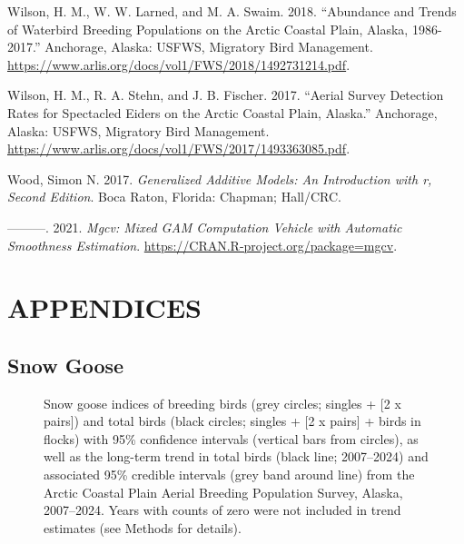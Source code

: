 \documentclass[
]{article}
\newlength{\cslhangindent}
\newenvironment{CSLReferences}[2] %
 {\begin{list}{}{%
  \setlength{\itemindent}{0pt}
  \setlength{\leftmargin}{0pt}
  \setlength{\parsep}{0pt}
  \ifodd #1
   \setlength{\leftmargin}{\cslhangindent}
   \setlength{\itemindent}{-1\cslhangindent}
  \fi
  \setlength{\itemsep}{#2\baselineskip}}}
 {\end{list}}
\begin{document}
\begin{CSLReferences}{1}{0}
Wilson, H. M., W. W. Larned, and M. A. Swaim. 2018. {``Abundance and
Trends of Waterbird Breeding Populations on the Arctic Coastal Plain,
Alaska, 1986-2017.''} Anchorage, Alaska: USFWS, Migratory Bird
Management.
\url{https://www.arlis.org/docs/vol1/FWS/2018/1492731214.pdf}.

Wilson, H. M., R. A. Stehn, and J. B. Fischer. 2017. {``Aerial Survey
Detection Rates for Spectacled Eiders on the Arctic Coastal Plain,
Alaska.''} Anchorage, Alaska: USFWS, Migratory Bird Management.
\url{https://www.arlis.org/docs/vol1/FWS/2017/1493363085.pdf}.

Wood, Simon N. 2017. \emph{Generalized Additive Models: An Introduction
with r, Second Edition}. Boca Raton, Florida: Chapman; Hall/CRC.

---------. 2021. \emph{Mgcv: Mixed GAM Computation Vehicle with
Automatic Smoothness Estimation}.
\url{https://CRAN.R-project.org/package=mgcv}.

\end{CSLReferences}

\newpage{}

\section*{APPENDICES}\label{appendices}

\subsection*{Snow Goose}\label{snow-goose}

\begin{figure}


\caption{\label{fig-SNGO}Snow goose indices of breeding birds (grey
circles; singles + {[}2 x pairs{]}) and total birds (black circles;
singles + {[}2 x pairs{]} + birds in flocks) with 95\% confidence
intervals (vertical bars from circles), as well as the long-term trend
in total birds (black line; 2007--2024) and associated 95\% credible
intervals (grey band around line) from the Arctic Coastal Plain Aerial
Breeding Population Survey, Alaska, 2007--2024. Years with counts of
zero were not included in trend estimates (see Methods for details).}

\end{figure}%
\end{document}

